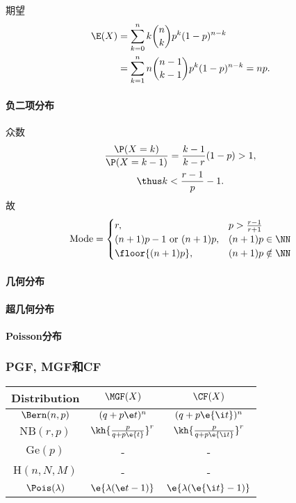 期望 
\begin{align*}
	\E(X)&=\sum_{k=0}^nk{n\choose k}p^k(1-p)^{n-k}\\
	&=\sum_{k=1}^{n}n{n-1\choose k-1}p^k(1-p)^{n-k}=np.
\end{align*}
\paragraph{负二项分布}众数
\begin{gather*}
	\frac{\P(X=k)}{\P(X=k-1)}=\frac{k-1}{k-r}(1-p)>1,\\
	\thus k<\frac{r-1}{p}-1.
\end{gather*}
故
\begin{align*}
	\text{Mode}=\begin{cases}
		r,&p>\frac{r-1}{r+1}\\
		(n+1)p-1\text{~or~}(n+1)p,&(n+1)p\in\NN\\
		\floor{(n+1)p},&(n+1)p\notin\NN
	\end{cases}
\end{align*}
\paragraph{几何分布}
\paragraph{超几何分布}
\paragraph{Poisson分布}
\subsubsection{PGF, MGF和CF}
\begin{center}
	\begin{tabular}{c|c|c}
		\toprule
		Distribution&$\MGF(X)$&$\CF(X)$\\
		\midrule
		$\Bern(n,p)$&$(q+p\e t)^n$&$(q+p\e{\i t})^n$\\
		\midrule
		$\mathrm{NB}(r,p)$&$\kh{\frac p{q+p\e{t}}}^r$&$\kh{\frac p{q+p\e{\i t}}}^r$\\
		\midrule
		$\mathrm{Ge}(p)$&-&-\\
		\midrule
		$\mathrm H(n,N,M)$&-&-\\
		\midrule
		$\Pois(\lambda)$&$\e{\lambda(\e t-1)}$&$\e{\lambda(\e{\i t}-1)}$\\
		\bottomrule
	\end{tabular}
\end{center}
\clearpage
